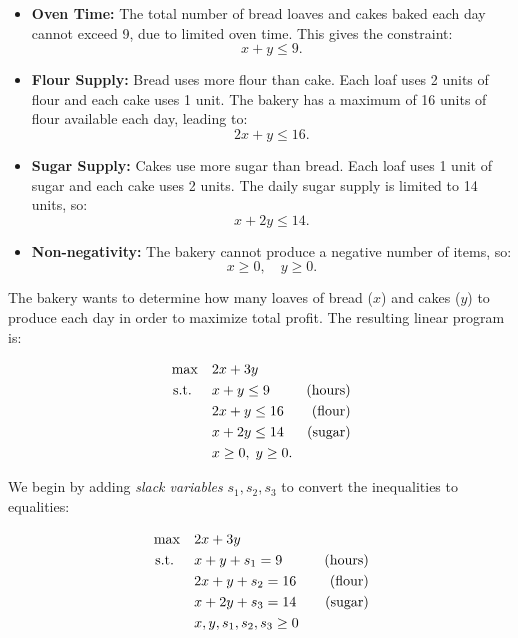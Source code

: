 \begin{itemize}
    \item \textbf{Oven Time:} The total number of bread loaves and cakes baked each day cannot exceed 9, due to limited oven time. This gives the constraint:
    \[
    x + y \leq 9.
    \]
    
    \item \textbf{Flour Supply:} Bread uses more flour than cake. Each loaf uses 2 units of flour and each cake uses 1 unit. The bakery has a maximum of 16 units of flour available each day, leading to:
    \[
    2x + y \leq 16.
    \]
    
    \item \textbf{Sugar Supply:} Cakes use more sugar than bread. Each loaf uses 1 unit of sugar and each cake uses 2 units. The daily sugar supply is limited to 14 units, so:
    \[
    x + 2y \leq 14.
    \]

    \item \textbf{Non-negativity:} The bakery cannot produce a negative number of items, so:
    \[
    x \geq 0, \quad y \geq 0.
    \]
\end{itemize}


The bakery wants to determine how many loaves of bread (\(x\)) and cakes (\(y\)) to produce each day in order to maximize total profit. The resulting linear program is:

\begin{tcolorbox}[colback=orange!5!white, colframe=orange!75!black,    
    width=0.6\textwidth, %
    box align=center, 
    title=\textbf{Original Linear Program}]
\[
\begin{aligned}
\max \quad & 2x + 3y \\
\text{ s.t. } \quad 
& x + y \leq 9  & \text{(hours)}\\
& 2x + y \leq 16  & \text{(flour)}\\
& x + 2y \leq 14 & \text{(sugar)}\\
& x \geq 0,\; y \geq 0.
\end{aligned}
\]
\end{tcolorbox}

We begin by adding \emph{slack variables} \( s_1, s_2, s_3 \) to convert the inequalities to equalities:

\begin{tcolorbox}[colback=gray!5!white, colframe=gray!75!black,    
    width=0.6\textwidth, %
    box align=center, 
    title=\textbf{Standard Form}]
\[
\begin{aligned}
\max \quad & 2x + 3y \\
\text{ s.t. } \quad 
&x + y + s_1 = 9 \quad &\text{(hours)} \\
&2x + y + s_2 = 16 \quad &\text{(flour)} \\
&x + 2y + s_3 = 14 \quad &\text{(sugar)} \\
&x, y, s_1, s_2, s_3 \geq 0
\end{aligned}
\]
\end{tcolorbox}

